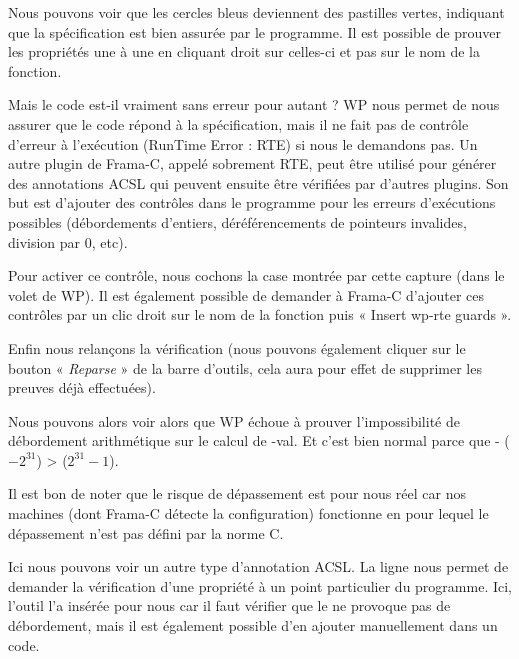Nous pouvons voir que les cercles bleus deviennent des pastilles vertes, 
indiquant que la spécification est bien assurée par le programme. Il est 
possible de prouver les propriétés une à une en cliquant droit sur celles-ci 
et pas sur le nom de la fonction.



Mais le code est-il vraiment sans erreur pour autant ? WP nous permet de nous 
assurer que le code répond à la spécification, mais il ne fait pas de contrôle 
d'erreur à l'exécution (RunTime Error : RTE) si nous le demandons pas. Un autre
plugin de Frama-C, appelé sobrement RTE, peut être utilisé pour générer des
annotations ACSL qui peuvent ensuite être vérifiées par d'autres plugins.
Son but est
d'ajouter des contrôles dans le programme pour les erreurs d'exécutions 
possibles (débordements d'entiers, déréférencements de pointeurs invalides, 
division par 0, etc).



Pour activer ce contrôle, nous cochons la case montrée par cette capture (dans 
le volet de WP). Il est également possible de demander à Frama-C d'ajouter ces 
contrôles par un clic droit sur le nom de la fonction puis « Insert wp-rte guards ».





Enfin nous relançons la vérification (nous pouvons également cliquer sur le 
bouton « \textit{Reparse} » de la barre d'outils, cela aura pour effet de supprimer les
preuves déjà effectuées).



Nous pouvons alors voir alors que WP échoue à prouver  l'impossibilité de 
débordement arithmétique sur le calcul de -val. Et c'est bien normal parce 
que - ($-2^{31}$) >  ($2^{31}-1$).





\begin{Information}
Il est bon de noter que le risque de dépassement est pour nous réel car nos
machines (dont Frama-C détecte la configuration) fonctionne en 
pour lequel le dépassement n'est pas défini par la norme C.
\end{Information}


Ici nous pouvons voir un autre type d'annotation ACSL. La 
ligne  nous permet de demander la vérification 
d'une propriété à un point particulier du programme. Ici, l'outil l'a 
insérée pour nous car il faut vérifier que le  ne provoque pas de 
débordement, mais il est également possible d'en ajouter manuellement dans 
un code.



